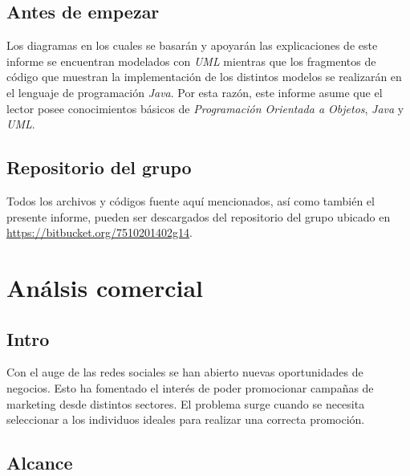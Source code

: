\documentclass[oneside]{book}
\begin{document}
%
%
\section*{\bfseries\color{black}Antes de empezar}

Los diagramas en los cuales se basarán y apoyarán las explicaciones de este informe se encuentran modelados con \textit{UML} mientras que los fragmentos de código que muestran la implementación de los distintos modelos se realizarán en el lenguaje de programación \textit{Java}. Por esta razón, este informe asume que el lector posee conocimientos básicos de \textit{Programación Orientada a Objetos}, \textit{Java} y \textit{UML}.
\bigskip


\section*{\bfseries\color{black}Repositorio del grupo}

Todos los archivos y códigos fuente aquí mencionados, así como también el presente informe, pueden ser descargados del repositorio del grupo ubicado en  \url{https://bitbucket.org/7510201402g14}.
\bigskip



\tableofcontents

\setcounter{page}{0}
\thispagestyle{empty}





\chapter{An\'{a}lsis comercial}


\section{Intro}

Con el auge de las redes sociales se han abierto nuevas oportunidades de negocios. Esto ha fomentado el interés de poder promocionar campañas de marketing desde distintos sectores.
El problema surge cuando se necesita seleccionar a los individuos ideales para realizar una correcta promoci\'{o}n.


\section{Alcance}
\end{document}
